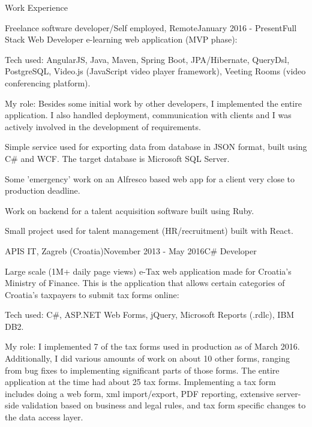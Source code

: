 \documentclass{resume}
\begin{document}
\begin{rSection}{Work Experience}
\begin{rSubsection}{Freelance software developer/Self employed, Remote}{January 2016 - Present}{Full Stack Web Developer}{}
e-learning web application (MVP phase):

\begin{rList}
\item Tech used: AngularJS, Java, Maven, Spring Boot, JPA/Hibernate, QueryDsl, PostgreSQL, Video.js (JavaScript video player framework), Veeting Rooms (video conferencing platform).
\item My role: Besides some initial work by other developers, I implemented the entire application. I also handled deployment, communication with clients and I was actively involved in the development of requirements.
\end{rList}

Simple service used for exporting data from database in JSON format, built using C\# and WCF. The target database is Microsoft SQL Server.

Some 'emergency' work on an Alfresco based web app for a client very close to production deadline.

Work on backend for a talent acquisition software built using Ruby.

Small project used for talent management (HR/recruitment) built with React.

\end{rSubsection}

\vspace{2.0em}

\begin{rSubsection}{APIS IT, Zagreb (Croatia)}{November 2013 - May 2016}{C\# Developer}{}

Large scale (1M+ daily page views) e-Tax web application made for Croatia’s Ministry of Finance. This is the application that allows certain categories of Croatia’s taxpayers to submit tax forms online:

\begin{rList}
\item Tech used: C\#, ASP.NET Web Forms, jQuery, Microsoft Reports (.rdlc), IBM DB2.
\item My role: I implemented 7 of the tax forms used in production as of March 2016. Additionally, I did various amounts of work on about 10 other forms, ranging from bug fixes to implementing significant parts of those forms. The entire application at the time had about 25 tax forms. Implementing a tax form includes doing a web form, xml import/export, PDF reporting, extensive server-side validation based on business and legal rules, and tax form specific changes to the data access layer.
\end{rList}


\end{rSubsection}
\end{rSection}
\end{document}
